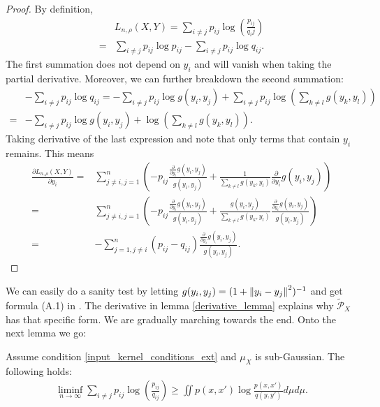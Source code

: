\begin{proof}
    By definition,
    \begin{align}
          & L_{n, \rho}(X,Y) = \sum_{i \neq j} p_{ij} \log \left(\frac{p_{ij}}{q_ij}\right) \nonumber \\
        = & \sum_{i \neq j} p_{ij} \log p_{ij} - \sum_{i \neq j} p_{ij} \log q_{ij}.
    \end{align}
    The first summation does not depend on $y_i$ and will vanish when taking the partial derivative. Moreover, we can further breakdown the second summation:
    \begin{align}
          & - \sum_{i \neq j} p_{ij} \log q_{ij} = - \sum_{i \neq j} p_{ij} \log g(y_i,y_j) + \sum_{i \neq j} p_{ij} \log \left(\sum_{k \neq l} g(y_k,y_l) \right)\nonumber \\
        = & - \sum_{i \neq j} p_{ij} \log g(y_i,y_j) + \log \left(\sum_{k \neq l} g(y_k,y_l)\right).
    \end{align}
    Taking derivative of the last expression and note that only terms that contain $y_i$ remains. This means
    \begin{align} \label{L_derivative}
        \frac{\partial L_{n, \rho}(X,Y)}{\partial y_i} = & \sum_{j \neq i, j = 1}^n \left(-p_{ij}\frac{\frac{\partial}{\partial y_i}g(y_i,y_j)}{g(y_i,y_j)} + \frac{1}{\sum_{k \neq l} g(y_k,y_l)} \frac{\partial}{\partial y_i} g(y_i,y_j)\right) \nonumber                            \\
        =                                                & \sum_{j \neq i, j = 1}^n \left(-p_{ij}\frac{\frac{\partial}{\partial y_i}g(y_i,y_j)}{g(y_i,y_j)} + \frac{g(y_i,y_j)}{\sum_{k \neq l} g(y_k,y_l)} \frac{\frac{\partial}{\partial y_i}g(y_i,y_j)}{g(y_i,y_j)}\right) \nonumber \\
        =                                                & -\sum_{j=1, j \neq i}^n (p_{ij}-q_{ij}) \frac{\frac{\partial}{\partial y_i}g(y_i,y_j)}{g(y_i,y_j)}.
    \end{align}
\end{proof}
We can easily do a sanity test by letting $g(y_i,y_j) = (1+\left\lVert y_i-y_j\right\rVert^2)^{-1}$ and get formula (A.1) in \cite{auffinger-tsne}. The derivative in lemma \ref{derivative_lemma} explains why
$\tilde{\mathcal{{P}}}_X$ has that specific form. We are gradually marching
towards the end. Onto the next lemma we go:
\begin{lemma} \label{lower_bound_lemma_2}
    Assume condition \ref{input_kernel_conditions_ext} and $\mu_X$ is sub-Gaussian. The following holds:
    \begin{align}
        \liminf_{n \to \infty}\sum_{i \neq j} p_{ij} \log \left(\frac{p_{ij}}{q_{ij}}\right) \geq \iint p(x,x')\log \frac{p(x,x')}{q(y,y')} d\mu d\mu.
    \end{align}
\end{lemma}
